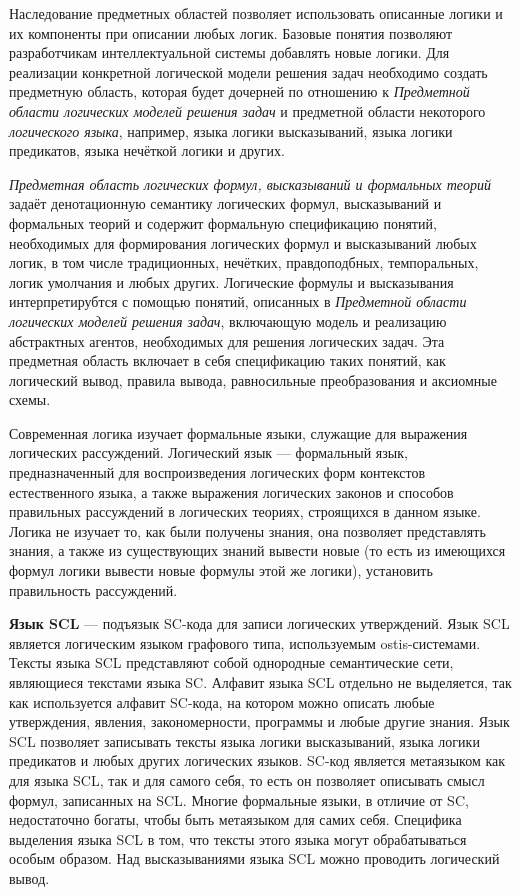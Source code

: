 Наследование предметных областей позволяет использовать описанные логики и их компоненты при описании любых логик. Базовые понятия позволяют разработчикам интеллектуальной системы добавлять новые логики. Для реализации конкретной логической модели решения задач необходимо создать предметную область, которая будет дочерней по отношению к \textit{Предметной области логических моделей решения задач} и предметной области некоторого \textit{логического языка}, например, языка логики высказываний, языка логики предикатов, языка нечёткой логики и других.

\textit{Предметная область логических формул, высказываний и формальных теорий} задаёт денотационную семантику логических формул, высказываний и формальных теорий и содержит формальную спецификацию понятий, необходимых для формирования логических формул и высказываний любых логик, в том числе традиционных, нечётких, правдоподбных, темпоральных, логик умолчания и любых других. Логические формулы и высказывания интерпретирубтся с помощью понятий, описанных в \textit{Предметной области логических моделей решения задач}, включающую модель и реализацию абстрактных агентов, необходимых для решения логических задач. Эта предметная область включает в себя спецификацию таких понятий, как логический вывод, правила вывода, равносильные преобразования и аксиомные схемы.

Современная логика изучает формальные языки, служащие для выражения логических рассуждений. Логический язык — формальный язык, предназначенный для воспроизведения логических форм контекстов естественного языка, а также выражения логических законов и способов правильных рассуждений в логических теориях, строящихся в данном языке. Логика не изучает то, как были получены знания, она позволяет представлять знания, а также из существующих знаний вывести новые (то есть из имеющихся формул логики вывести новые формулы этой же логики), установить правильность рассуждений.

\textbf{Язык SCL} — подъязык SC-кода для записи логических утверждений. Язык SCL является логическим языком графового типа, используемым ostis-системами. Тексты языка SCL представляют собой однородные семантические сети, являющиеся текстами языка SC. Алфавит языка SCL отдельно не выделяется, так как используется алфавит SC-кода, на котором можно описать любые утверждения, явления, закономерности, программы и любые другие знания. Язык SCL позволяет записывать тексты языка логики высказываний, языка логики предикатов и любых других логических языков. SC-код является метаязыком как для языка SCL, так и для самого себя, то есть он позволяет описывать смысл формул, записанных на SCL. Многие формальные языки, в отличие от SC, недостаточно богаты, чтобы быть метаязыком для самих себя. Специфика выделения языка SCL в том, что тексты этого языка могут обрабатываться особым образом. Над высказываниями языка SCL можно проводить логический вывод.

